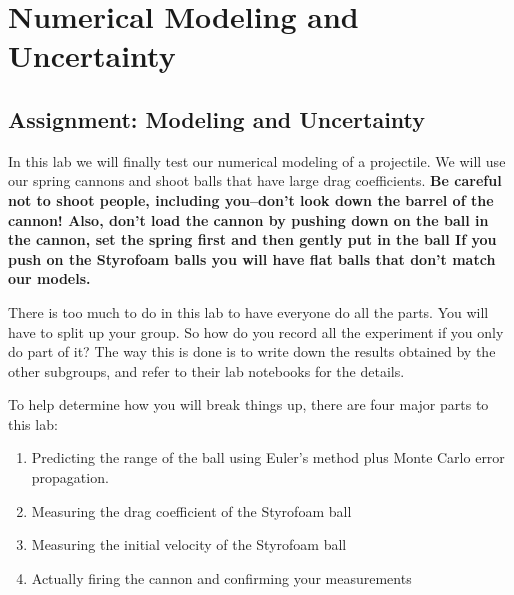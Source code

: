 \documentclass[twoside,11pt,ShortChapTitles]{BYUTextbook}
\begin{document}
\chapter[Numerical Modeling III]{Numerical Modeling and Uncertainty}
\section{Assignment: Modeling and Uncertainty}

In this lab we will finally test our numerical modeling of a projectile. We
will use our spring cannons and shoot balls that have large drag
coefficients. \textbf{Be careful not to shoot people, including you--don't
look down the barrel of the cannon! Also, don't load the cannon by pushing
down on the ball in the cannon, set the spring first and then gently put in
the ball If you push on the Styrofoam balls you will have flat balls that
don't match our models. }

There is too much to do in this lab to have everyone do all the parts. You
will have to split up your group. So how do you record all the experiment if
you only do part of it? The way this is done is to write down the results
obtained by the other subgroups, and refer to their lab notebooks for the
details.

To help determine how you will break things up, there are four major parts to this lab:

\begin{enumerate}
\item Predicting the range of the ball using Euler's method plus Monte Carlo error propagation.
\item Measuring the drag coefficient of the Styrofoam ball
\item Measuring the initial velocity of the Styrofoam ball
\item Actually firing the cannon and confirming your measurements

\end{enumerate}
\end{document}
